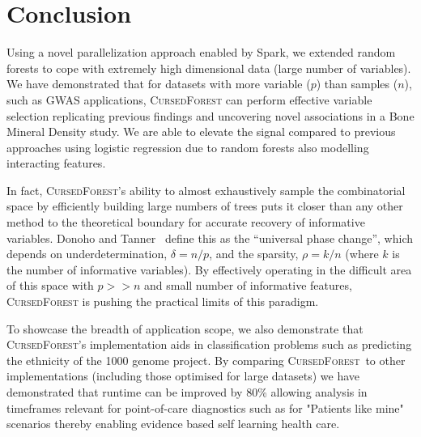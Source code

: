 \documentclass[10pt,letterpaper]{article}
\newcommand{\cursedforest}{\textsc{CursedForest}\xspace}
\newcommand{\mtry}{\texttt{mtry}\xspace}
\begin{document}




\section{Conclusion}

Using a novel parallelization approach enabled by Spark, we extended random forests to cope with extremely high dimensional data (large number of variables). 
We have demonstrated that for datasets with more variable ($p$) than samples ($n$), such as GWAS applications, \cursedforest can perform effective variable selection replicating previous findings and uncovering novel associations in a Bone Mineral Density study. 
We are able to elevate the signal compared to previous approaches using logistic regression due to random forests also modelling interacting features.

In fact, \cursedforest's ability to almost exhaustively sample the combinatorial space by efficiently building large numbers of trees puts it closer than any other method to the theoretical boundary for accurate recovery of informative variables. Donoho and Tanner~\cite{Donoho.and.Tanner.2009} define this as the ``universal phase change'', which depends on underdetermination, $\delta = n/p$, and the sparsity, $\rho =k/n$ (where $k$ is the number of informative variables). 
By effectively operating in the difficult area of this space with $p >> n$ and small number of informative features, \cursedforest is pushing the practical limits of this paradigm. 

To showcase the breadth of application scope, we also demonstrate that \cursedforest's implementation aids in classification problems such as predicting the ethnicity of the 1000 genome project. 
By comparing \cursedforest\ to other implementations (including those optimised for large datasets) we have demonstrated that runtime can be improved by 80\% allowing analysis in timeframes relevant for point-of-care diagnostics such as for "Patients like mine" scenarios thereby enabling evidence based self learning health care. 
\end{document}
